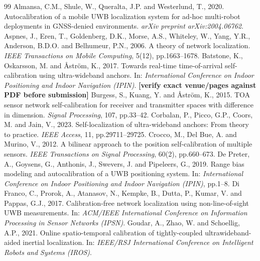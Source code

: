 \documentclass[11pt,a4paper]{article}
\begin{document}
\begin{thebibliography}{99}
 Almansa, C.M., Shule, W., Queralta, J.P. and Westerlund, T., 2020. Autocalibration of a mobile UWB localization system for ad-hoc multi-robot deployments in GNSS-denied environments. \emph{arXiv preprint arXiv:2004.06762}.
 Aspnes, J., Eren, T., Goldenberg, D.K., Morse, A.S., Whiteley, W., Yang, Y.R., Anderson, B.D.O. and Belhumeur, P.N., 2006. A theory of network localization. \emph{IEEE Transactions on Mobile Computing}, 5(12), pp.1663--1678.
 Batstone, K., Oskarsson, M. and \AA{}str\"om, K., 2017. Towards real-time time-of-arrival self-calibration using ultra-wideband anchors. In: \emph{International Conference on Indoor Positioning and Indoor Navigation (IPIN)}. \textbf{[verify exact venue/pages against PDF before submission]}
 Burgess, S., Kuang, Y. and \AA{}str\"om, K., 2015. TOA sensor network self-calibration for receiver and transmitter spaces with difference in dimension. \emph{Signal Processing}, 107, pp.33--42.
 Corbalan, P., Picco, G.P., Coors, M. and Jain, V., 2023. Self-localization of ultra-wideband anchors: From theory to practice. \emph{IEEE Access}, 11, pp.29711--29725.
 Crocco, M., Del Bue, A. and Murino, V., 2012. A bilinear approach to the position self-calibration of multiple sensors. \emph{IEEE Transactions on Signal Processing}, 60(2), pp.660--673.
 De Preter, A., Goysens, G., Anthonis, J., Swevers, J. and Pipeleers, G., 2019. Range bias modeling and autocalibration of a UWB positioning system. In: \emph{International Conference on Indoor Positioning and Indoor Navigation (IPIN)}, pp.1--8.
 Di Franco, C., Prorok, A., Atanasov, N., Kempke, B., Dutta, P., Kumar, V. and Pappas, G.J., 2017. Calibration-free network localization using non-line-of-sight UWB measurements. In: \emph{ACM/IEEE International Conference on Information Processing in Sensor Networks (IPSN)}.
 Goudar, A., Zhao, W. and Schoellig, A.P., 2021. Online spatio-temporal calibration of tightly-coupled ultrawideband-aided inertial localization. In: \emph{IEEE/RSJ International Conference on Intelligent Robots and Systems (IROS)}.

\end{thebibliography}
\end{document}
